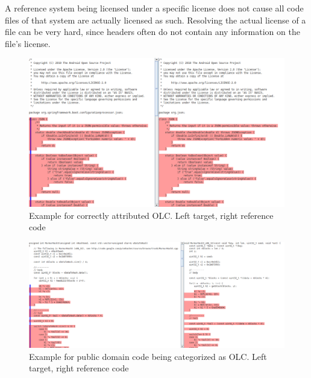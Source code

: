 A reference system being licensed under a specific license does not cause all code files of that system are actually licensed as such.
Resolving the actual license of a file can be very hard, since headers often do not contain any information on the file's license.
\begin{figure}[h!]
	\centering
	\includegraphics[width=\linewidth]{figures/olc_attributed.png}
	\caption{Example for correctly attributed OLC. Left target, right reference code}\label{fig:olc_attributed}
\end{figure}
\begin{figure}[h!]
	\centering
	\includegraphics[width=\linewidth]{figures/olc_public_domain.png}
	\caption{Example for public domain code being categorized as OLC. Left target, right reference code}\label{fig:olc_public_domain}
\end{figure}

\newpage
